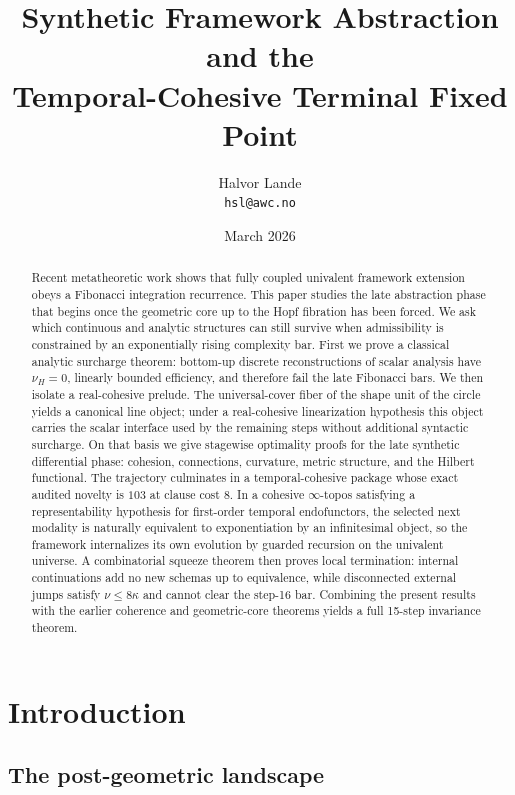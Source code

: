 \documentclass[11pt]{article}
\title{\textbf{Synthetic Framework Abstraction and the\\ Temporal-Cohesive Terminal Fixed Point}}
\author{Halvor Lande\\\texttt{hsl@awc.no}}
\date{March 2026}
\theoremstyle{plain}
\theoremstyle{definition}
\theoremstyle{remark}
\begin{document}
\maketitle

\begin{abstract}
Recent metatheoretic work shows that fully coupled univalent framework extension obeys a Fibonacci integration recurrence. This paper studies the late abstraction phase that begins once the geometric core up to the Hopf fibration has been forced. We ask which continuous and analytic structures can still survive when admissibility is constrained by an exponentially rising complexity bar. First we prove a classical analytic surcharge theorem: bottom-up discrete reconstructions of scalar analysis have $\nu_H=0$, linearly bounded efficiency, and therefore fail the late Fibonacci bars. We then isolate a real-cohesive prelude. The universal-cover fiber of the shape unit of the circle yields a canonical line object; under a real-cohesive linearization hypothesis this object carries the scalar interface used by the remaining steps without additional syntactic surcharge. On that basis we give stagewise optimality proofs for the late synthetic differential phase: cohesion, connections, curvature, metric structure, and the Hilbert functional. The trajectory culminates in a temporal-cohesive package whose exact audited novelty is $103$ at clause cost $8$. In a cohesive $\infty$-topos satisfying a representability hypothesis for first-order temporal endofunctors, the selected next modality is naturally equivalent to exponentiation by an infinitesimal object, so the framework internalizes its own evolution by guarded recursion on the univalent universe. A combinatorial squeeze theorem then proves local termination: internal continuations add no new schemas up to equivalence, while disconnected external jumps satisfy $\nu\le 8\kappa$ and cannot clear the step-16 bar. Combining the present results with the earlier coherence and geometric-core theorems yields a full 15-step invariance theorem.
\end{abstract}

\section{Introduction}

\subsection{The post-geometric landscape}
\end{document}
